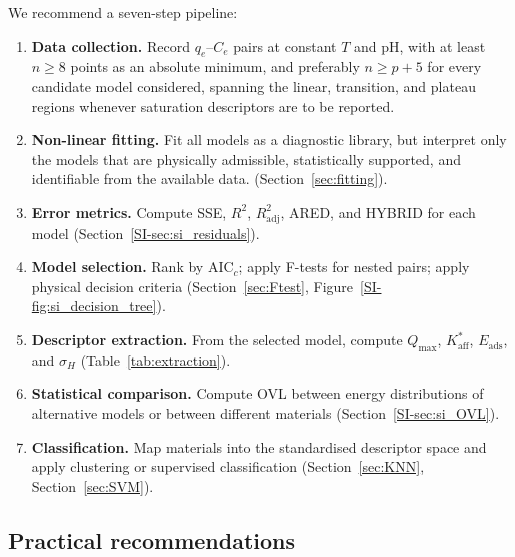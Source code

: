 \documentclass[journal=jacsat,manuscript=article]{achemso}
\begin{document}
	We recommend a seven-step pipeline:
	\begin{enumerate}
		\item \textbf{Data collection.} Record $q_e$--$C_e$ pairs at constant $T$ and pH, with at least \(n \geq 8\) points as an absolute minimum, and preferably \(n \geq p+5\) for every candidate model considered, spanning the linear, transition, and plateau regions whenever saturation descriptors are to be reported.
		\item \textbf{Non-linear fitting.} Fit all models as a diagnostic library, but interpret only the models that are physically admissible, statistically supported, and identifiable from the available data. (Section~\ref{sec:fitting}).
		\item \textbf{Error metrics.} Compute SSE, $R^2$, $R^2_{\mathrm{adj}}$, ARED, and HYBRID for each model (Section~\ref{SI-sec:si_residuals}).
		\item \textbf{Model selection.} Rank by AIC$_c$; apply F-tests for nested pairs; apply physical decision criteria (Section~\ref{sec:Ftest}, Figure~\ref{SI-fig:si_decision_tree}).
		\item \textbf{Descriptor extraction.} From the selected model, compute $Q_{\max}$, $K_{\mathrm{aff}}^{\ast}$, $E_{\mathrm{ads}}$, and $\sigma_H$ (Table~\ref{tab:extraction}).
		\item \textbf{Statistical comparison.} Compute OVL between energy distributions of alternative models or between different materials (Section~\ref{SI-sec:si_OVL}).
		\item \textbf{Classification.} Map materials into the standardised descriptor space and apply clustering or supervised classification (Section~\ref{sec:KNN}, Section~\ref{sec:SVM}).
	\end{enumerate}

	\subsection{Practical recommendations}
	\label{sec:practical}
\end{document}
